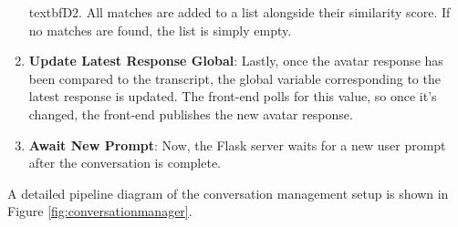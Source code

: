 \documentclass[12pt]{report}
\begin{document}
\begin{myfont}
\begin{enumerate}
            textbf{D2}. All matches are added to a list alongside their similarity score. If no matches are found, the list is simply empty.
            \item \textbf{Update Latest Response Global}: Lastly, once the avatar response has been compared to the transcript, the global variable corresponding to the latest response is updated. The front-end polls for this value, so once it's changed, the front-end publishes the new avatar response.
            \item \textbf{Await New Prompt}: Now, the Flask server waits for a new user prompt after the conversation is complete.
        \end{enumerate}

        A detailed pipeline diagram of the conversation management setup is shown in Figure \ref{fig:conversationmanager}.

        \begin{figure}[H]
            \centering
            \noindent{}
\end{figure}
\end{myfont}
\end{document}
